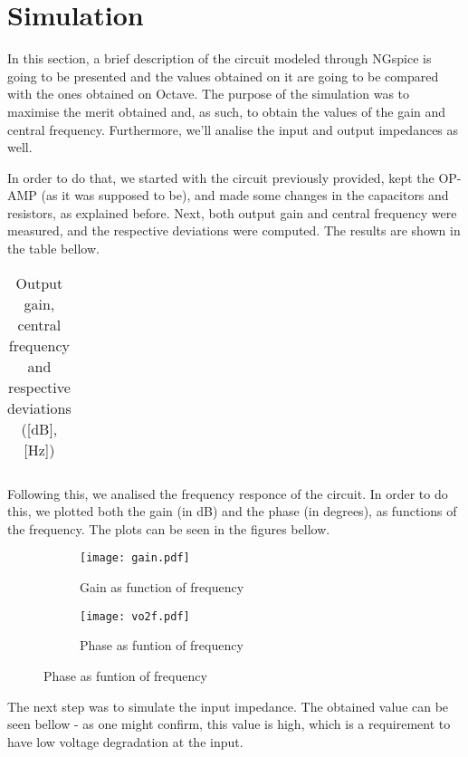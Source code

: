 \section{Simulation}
\label{sec:simulation}

\par In this section, a brief description of the circuit modeled through NGspice is going to be presented and the values obtained on it are going to be compared with the ones obtained on Octave. The purpose of the simulation was to maximise the merit obtained and, as such, to obtain the values of the gain and central frequency. Furthermore, we'll analise the input and output impedances as well.

\par In order to do that, we started with the circuit previously provided, kept the OP-AMP (as it was supposed to be), and made some changes in the capacitors and resistors, as explained before. Next, both output gain and central frequency were measured, and the respective deviations were computed. The results are shown in the table bellow.

\begin{table}[H]
  \centering
  \begin{tabular}{|l|r|}
    \hline    
   
     \end{tabular}
  \caption{Output gain, central frequency and respective deviations ([dB],[Hz])}
\end{table}
  
\par Following this, we analised the frequency responce of the circuit. In order to do this, we plotted both the gain (in dB) and the phase (in degrees), as functions of the frequency. The plots can be seen in the figures bellow.

\begin{figure}[H]
\centering
\begin{subfigure}{.5\textwidth}
  \centering
  \texttt{[image: gain.pdf]}
  \caption{Gain as function of frequency}
  \label{fig:sim1}
\end{subfigure}%
\begin{subfigure}{.5\textwidth}
  \centering
  \texttt{[image: vo2f.pdf]}
  \caption{Phase as funtion of frequency}
  \label{fig:sim2}
\end{subfigure}
\end{figure}

\par The next step was to simulate the input impedance. The obtained value can be seen bellow - as one might confirm, this value is high, which is a requirement to have low voltage degradation at the input.

